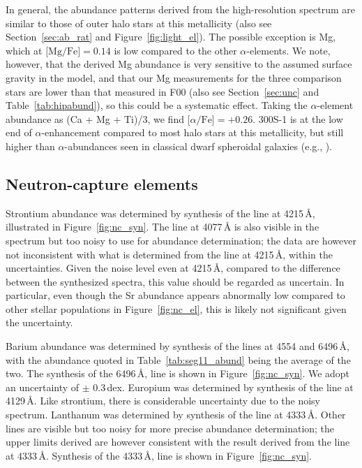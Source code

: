 \documentclass{emulateapj}
\begin{document}
In general, the abundance patterns derived from the high-resolution
spectrum are similar to those of outer halo stars at this metallicity
(also see Section~\ref{sec:ab_rat} and Figure~\ref{fig:light_el}). The
possible exception is Mg, which at $\mbox{[Mg/Fe]}=0.14$ is low
compared to the other $\alpha$-elements. We note, however, that the
derived Mg abundance is very sensitive to the assumed surface gravity
in the model, and that our Mg measurements for the three comparison
stars are lower than that measured in F00 (also see
Section~\ref{sec:unc} and Table~\ref{tab:hipabund}), so this could be
a systematic effect. Taking the $\alpha$-element abundance as (Ca + Mg
+ Ti)/3, we find $\mbox{[$\alpha$/Fe]}= +0.26 $. 300S-1 is at the low
end of $\alpha$-enhancement compared to most halo stars at this
metallicity, but still higher than $\alpha$-abundances seen in
classical dwarf spheroidal galaxies (e.g., \citealt{Tolstoy2009}).



\subsection{Neutron-capture elements}

Strontium abundance was determined by synthesis of the line at
4215\,{\AA}, illustrated in Figure~\ref{fig:nc_syn}. The line at
4077\,{\AA} is also visible in the spectrum but too noisy to use for
abundance determination; the data are however not inconsistent with
what is determined from the line at 4215\,{\AA}, within the
uncertainties. Given the noise level even at 4215\,{\AA}, compared to
the difference between the synthesized spectra, this value should be
regarded as uncertain. In particular, even though the Sr abundance
appears abnormally low compared to other stellar populations in
Figure~\ref{fig:nc_el}, this is likely not significant given the
uncertainty.

Barium abundance was determined by synthesis of the lines at 4554 and
6496\,{\AA}, with the abundance quoted in Table~\ref{tab:seg11_abund}
being the average of the two. The synthesis of the 6496\,{\AA}, line
is shown in Figure~\ref{fig:nc_syn}. We adopt an uncertainty of $\pm$
0.3\,dex. Europium was determined by synthesis of the line at
4129\,{\AA}. Like strontium, there is considerable uncertainty due to
the noisy spectrum. Lanthanum was determined by synthesis of the line
at 4333\,{\AA}. Other lines are visible but too noisy for more precise
abundance determination; the upper limits derived are however
consistent with the result derived from the line at
4333\,{\AA}. Synthesis of the 4333\,{\AA}, line is shown in
Figure~\ref{fig:nc_syn}.
\end{document}
